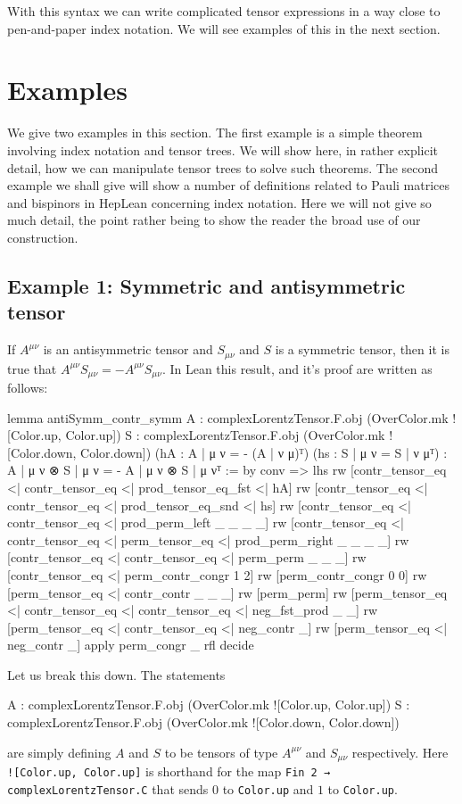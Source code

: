 \documentclass[a4paper, 11pt]{article}
\DeclareRobustCommand{\myinline}{\lstinline}
\begin{document}
With this syntax we can write complicated tensor expressions in a way close to pen-and-paper index notation. 
We will see examples of this in the next section.

\section{Examples} \label{sec:examples}

We give two examples in this section. The first example is a simple theorem involving index notation and 
tensor trees. We will show here, in rather explicit detail, how we can manipulate tensor trees to solve 
such theorems. 
The second example we shall give will show a number of definitions related to Pauli matrices and bispinors in HepLean concerning index notation.
Here we will not give so much detail, the point rather being to show the reader the broad use of our 
construction. 

\subsection{Example 1: Symmetric and antisymmetric tensor} \label{sec:exampleSymmAntiSymm}
If $A^{\mu \nu}$ is an antisymmetric tensor and $S_{\mu \nu}$ and $S$ is a symmetric tensor, then
it is true that $A^{\mu \nu} S_{\mu \nu} = - A^{\mu \nu} S_{\mu \nu}$. In Lean this result, and 
it's proof are written as follows: 
\begin{codeLong}
lemma antiSymm_contr_symm 
    {A : complexLorentzTensor.F.obj (OverColor.mk ![Color.up, Color.up])}
    {S : complexLorentzTensor.F.obj (OverColor.mk ![Color.down, Color.down])}
    (hA : {A | μ ν = - (A | ν μ)}ᵀ) (hs : {S | μ ν = S | ν μ}ᵀ) :
    {A | μ ν ⊗ S | μ ν = - A | μ ν ⊗ S | μ ν}ᵀ := by
  conv =>
    lhs
    rw [contr_tensor_eq <| contr_tensor_eq <| prod_tensor_eq_fst <| hA]
    rw [contr_tensor_eq <| contr_tensor_eq <| prod_tensor_eq_snd <| hs]
    rw [contr_tensor_eq <| contr_tensor_eq <| prod_perm_left _ _ _ _]
    rw [contr_tensor_eq <| contr_tensor_eq <| perm_tensor_eq <| prod_perm_right _ _ _ _]
    rw [contr_tensor_eq <| contr_tensor_eq <| perm_perm _ _ _]
    rw [contr_tensor_eq <| perm_contr_congr 1 2]
    rw [perm_contr_congr 0 0]
    rw [perm_tensor_eq <| contr_contr _ _ _]
    rw [perm_perm]
    rw [perm_tensor_eq <| contr_tensor_eq <| contr_tensor_eq <| neg_fst_prod _ _]
    rw [perm_tensor_eq <| contr_tensor_eq <| neg_contr _]
    rw [perm_tensor_eq <| neg_contr _]
  apply perm_congr _ rfl
  decide
\end{codeLong}
Let us break this down. The statements 
\begin{code} 
{A : complexLorentzTensor.F.obj (OverColor.mk ![Color.up, Color.up])}
{S : complexLorentzTensor.F.obj (OverColor.mk ![Color.down, Color.down])}
\end{code}
are simply defining $A$ and $S$ to be tensors of type $A^{\mu \nu}$ and $S_{\mu \nu}$ respectively.
Here \myinline|![Color.up, Color.up]| is shorthand for the map \myinline|Fin 2 → complexLorentzTensor.C| that sends
$0$ to \myinline|Color.up| and $1$ to \myinline|Color.up|.
\end{document}
